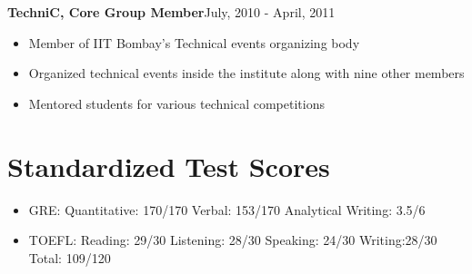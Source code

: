 \documentclass[margin,line]{res}
\begin{document}
\begin{resume}
\textbf{TechniC, Core Group Member}\hfill{July, 2010 - April, 2011}
\begin{itemize}
\item Member of IIT Bombay's Technical events organizing body
\item{Organized technical events inside the institute along with nine other members }
\item{Mentored students for various technical competitions}
\end{itemize}

\section{\sc Standardized Test Scores}
\begin{itemize}
\item GRE: Quantitative: 170/170 Verbal: 153/170 Analytical Writing: 3.5/6
\item TOEFL: Reading: 29/30 Listening: 28/30 Speaking: 24/30 Writing:28/30 Total: 109/120
\end{itemize}

\end{resume}
\end{document}
